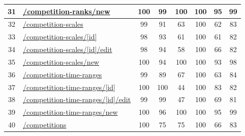 \begin{longtable}{|c|p{5cm}|c|c|c|c|c|c|}
      \hline
      31                                       & \url{/competition-ranks/new}                               & 100              & 99               & 100              & 100              & 95               & 99            \\
      \hline
      32                                       & \url{/competition-scales}                                  & 99               & 91               & 63               & 100              & 62               & 83            \\
      \hline
      33                                       & \url{/competition-scales/[id]}                             & 98               & 93               & 61               & 100              & 61               & 82            \\
      \hline
      34                                       & \url{/competition-scales/[id]/edit}                        & 98               & 94               & 58               & 100              & 66               & 82            \\
      \hline
      35                                       & \url{/competition-scales/new}                              & 100              & 94               & 100              & 100              & 93               & 98            \\
      \hline
      36                                       & \url{/competition-time-ranges}                             & 99               & 89               & 67               & 100              & 63               & 84            \\
      \hline
      37                                       & \url{/competition-time-ranges/[id]}                        & 100              & 100              & 44               & 100              & 83               & 82            \\
      \hline
      38                                       & \url{/competition-time-ranges/[id]/edit}                   & 99               & 99               & 47               & 100              & 69               & 81            \\
      \hline
      39                                       & \url{/competition-time-ranges/new}                         & 100              & 96               & 100              & 100              & 95               & 99            \\
      \hline
      40                                       & \url{/competitions}                                        & 100              & 75               & 75               & 100              & 66               & 83            \\

\end{longtable}
